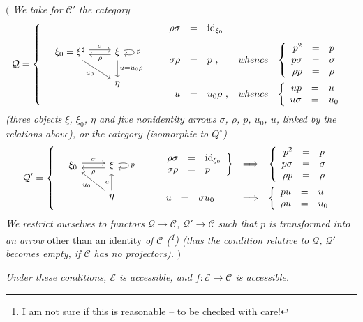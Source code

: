 $\Big($ \textit{We take for $\mathcal{C}'$ the category}
\[
\mathcal{Q} = \left\{ \quad
\begin{tikzcd}[column sep=2.2em]
\xi_0 = \xi^\natural \arrow[r, shift left, "\sigma"] \arrow[dr, "u_0"'] & \xi \arrow[l, shift left, "\rho"] \arrow[d, "u = u_0\rho"] \arrow[loop right, "p"] \\
 & \eta
\end{tikzcd}
\qquad
\begin{array}{rclll}
\rho\sigma & = & \mathrm{id}_{\xi_0} & & \\[2ex]
\sigma\rho & = & p\ , & \text{\textit{whence}} & \left\{\begin{array}{rcl} p^2 & = & p \\ p\sigma & = & \sigma \\ \rho p & = & \rho \end{array}\right. \\[4ex]
u & = & u_0\rho\ , & \text{\textit{whence}} & \left\{\begin{array}{rcl} up & = & u \\ u\sigma & = & u_0 \end{array}\right.
\end{array}
\right.
\]
\textit{(three objects $\xi$, $\xi_0$, $\eta$ and five nonidentity arrows $\sigma$, $\rho$, $p$, $u_0$, $u$, linked by the relations above), or the category (isomorphic to $Q^\circ$)} %
\[
\mathcal{Q}' = \left\{ \quad
\begin{tikzcd}
\xi_0 \arrow[r, shift left, "\sigma"] & \xi \arrow[l, shift left, "\rho"] \arrow[loop right, "p"] \\
 & \eta \arrow[ul, "u_0"] \arrow[u, "u"]
\end{tikzcd}
\qquad
\begin{array}{lcl}
\left.\begin{array}{rcl} \rho\sigma & = & \mathrm{id}_{\xi_0} \\ \sigma\rho & = & p \end{array}\right\} & \Longrightarrow & \left\{\begin{array}{rcl} p^2 & = & p \\ p\sigma & = & \sigma \\ \rho p & = & \rho \end{array}\right. \\[4ex]
\begin{array}{rcl} u & = & \sigma u_0 \end{array} & \Longrightarrow & \left\{\begin{array}{rcl} pu & = & u \\ \rho u & = & u_0 \end{array}\right.
\end{array}
\right.
\]
\textit{We restrict ourselves to functors $\mathcal{Q} \longrightarrow \mathcal{C}$, $\mathcal{Q}' \longrightarrow \mathcal{C}$ such that $p$ is transformed into an arrow} other than an identity \textit{of $\mathcal{C}$ (\footnote[195]{I am not sure if this is reasonable -- to be checked with care!}) (thus the condition relative to $\mathcal{Q}$, $\mathcal{Q}'$ becomes empty, if $\mathcal{C}$ has no projectors).} $\Big)$

\textit{Under these conditions, $\mathcal{E}$ is accessible, and $f : \mathcal{E} \longrightarrow \mathcal{C}$ is accessible.}